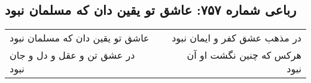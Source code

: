 \begin{center}
\section*{رباعی شماره ۷۵۷: عاشق تو یقین دان که مسلمان نبود}
\label{sec:0757}
\begin{longtable}{l p{0.5cm} r}
عاشق تو یقین دان که مسلمان نبود
&&
در مذهب عشق کفر و ایمان نبود
\\
در عشق تن و عقل و دل و جان نبود
&&
هرکس که چنین نگشت او آن نبود
\\
\end{longtable}
\end{center}
